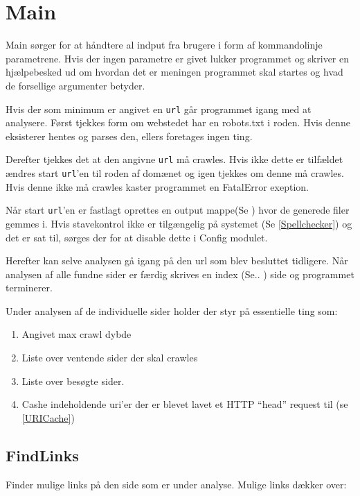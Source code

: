 \documentclass[a4paper,oneside,article]{memoir}
\begin{document}
\section{Main}
\label{Main}

Main sørger for at håndtere al indput fra brugere i form af
kommandolinje parametrene. Hvis der ingen parametre er givet lukker
programmet og skriver en hjælpebesked ud om hvordan det er meningen
programmet skal startes og hvad de forsellige argumenter betyder.

Hvis der som minimum er angivet en \texttt{url} går programmet igang
med at analysere.  Først tjekkes form om webstedet har en robots.txt i
roden. Hvis denne eksisterer hentes og parses den, ellers foretages
ingen ting.

Derefter tjekkes det at den angivne \texttt{url} må crawles. Hvis ikke
dette er tilfældet ændres start \texttt{url}'en til roden af domænet
og igen tjekkes om denne må crawles. Hvis denne ikke må crawles kaster
programmet en FatalError exeption.

Når start \texttt{url}'en er fastlagt oprettes en output mappe(Se ) hvor de generede filer gemmes i.
Hvis stavekontrol ikke er tilgængelig på systemet
(Se \ref{Spellchecker}) og det er sat til, sørges der for at
disable dette i Config modulet.

Herefter kan selve analysen gå igang på den url som blev besluttet
tidligere.  Når analysen af alle fundne sider er færdig skrives en
index (Se.. ) side og programmet terminerer.


Under analysen af de individuelle sider holder der styr på essentielle ting som:

\begin{enumerate}
 \item Angivet max crawl dybde
 \item Liste over ventende sider der skal crawles
 \item Liste over besøgte sider.
 \item Cashe indeholdende uri'er der er blevet lavet et HTTP ``head'' request til (se \ref{URICache})
\end{enumerate}

\subsection{FindLinks}
\label{findLinks}
Finder mulige links på den side som er under analyse. Mulige links dækker over:
\end{document}
